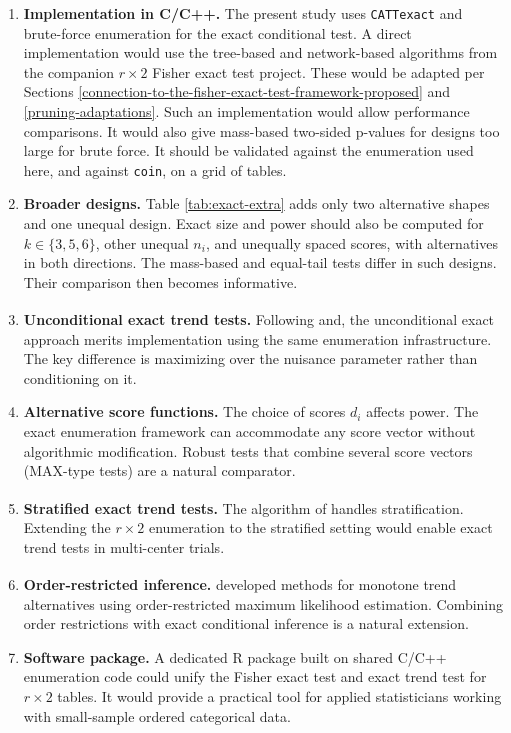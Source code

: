 \documentclass[
  11pt,
]{article}
\begin{document}
\begin{enumerate}
\def\labelenumi{\arabic{enumi}.}
\item
  \textbf{Implementation in C/C++.} The present study
  uses \texttt{CATTexact} and brute-force enumeration for the
  exact conditional test. A direct implementation would
  use the tree-based and network-based algorithms from
  the companion \(r \times 2\) Fisher exact test project.
  These would be adapted per Sections
  \ref{connection-to-the-fisher-exact-test-framework-proposed}
  and \ref{pruning-adaptations}. Such an implementation
  would allow performance comparisons. It would also
  give mass-based two-sided p-values for designs too
  large for brute force. It should be validated against
  the enumeration used here, and against \texttt{coin}, on a
  grid of tables.
\item
  \textbf{Broader designs.} Table \ref{tab:exact-extra} adds
  only two alternative shapes and one unequal design.
  Exact size and power should also be computed for
  \(k \in \{3, 5, 6\}\), other unequal \(n_i\), and unequally
  spaced scores, with alternatives in both directions.
  The mass-based and equal-tail tests differ in such
  designs. Their comparison then becomes informative.
\item
  \textbf{Unconditional exact trend tests.} Following\textsuperscript{} and\textsuperscript{}, the
  unconditional exact approach
  merits implementation using the same enumeration
  infrastructure. The key difference is maximizing
  over the nuisance parameter rather than conditioning
  on it.
\item
  \textbf{Alternative score functions.} The choice of scores
  \(d_i\) affects power. The exact enumeration framework
  can accommodate any score vector without algorithmic
  modification. Robust tests that combine several score
  vectors (MAX-type tests) are a natural comparator.
\item
  \textbf{Stratified exact trend tests.} The algorithm of\textsuperscript{} handles stratification. Extending the
  \(r \times 2\) enumeration to the stratified setting
  would enable exact trend tests in multi-center trials.
\item
  \textbf{Order-restricted inference.}\textsuperscript{}
  developed methods for monotone trend alternatives
  using order-restricted maximum likelihood estimation.
  Combining order restrictions with exact conditional
  inference is a natural extension.
\item
  \textbf{Software package.} A dedicated R package built
  on shared C/C++ enumeration code could unify the
  Fisher exact test and exact trend test for
  \(r \times 2\) tables. It would provide a practical tool
  for applied statisticians working with small-sample
  ordered categorical data.
\end{enumerate}
\end{document}
